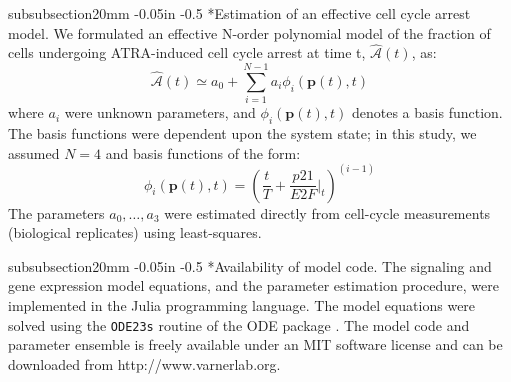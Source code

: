 \documentclass[12pt]{article}
\makeatletter
\renewcommand\subsubsection{\@startsection
	{subsubsection}{2}{0mm}
	{-0.05in}
	{-0.5\baselineskip}
	{\normalfont\normalsize\itshape}}
\makeatother
\begin{document}
\subsubsection*{Estimation of an effective cell cycle arrest model.}
We formulated an effective N-order polynomial model of the fraction of cells undergoing ATRA-induced cell cycle arrest at time t, $\hat{\mathcal{A}}(t)$, as:
\begin{equation}\label{eq:a-eqn}
	\hat{\mathcal{A}}\left(t\right)\simeq a_{0}+\sum_{i=1}^{N-1}a_{i}\phi_{i}\left(\mathbf{p}(t),t\right)
\end{equation}where $a_{i}$ were unknown parameters, and $\phi_{i}\left(\mathbf{p}(t),t\right)$ denotes a basis function.
The basis functions were dependent upon the system state; in this study, we assumed $N = 4$ and basis functions of the form:
\begin{equation}
	\phi_{i}\left(\mathbf{p}(t),t\right) = \left(\frac{t}{T}+\frac{p21}{E2F}\Bigr|_{t}\right)^{(i-1)}
\end{equation}
The parameters $a_{0},\hdots,a_{3}$ were estimated directly from cell-cycle measurements (biological replicates) using least-squares.

\subsubsection*{Availability of model code.}
The signaling and gene expression model equations, and the parameter estimation procedure, were implemented in the Julia programming language.
The model equations were solved using the \texttt{ODE23s} routine of the ODE package \cite{Julia}.
The model code and parameter ensemble is freely available under an MIT software license and can be downloaded from http://www.varnerlab.org.
\end{document}
